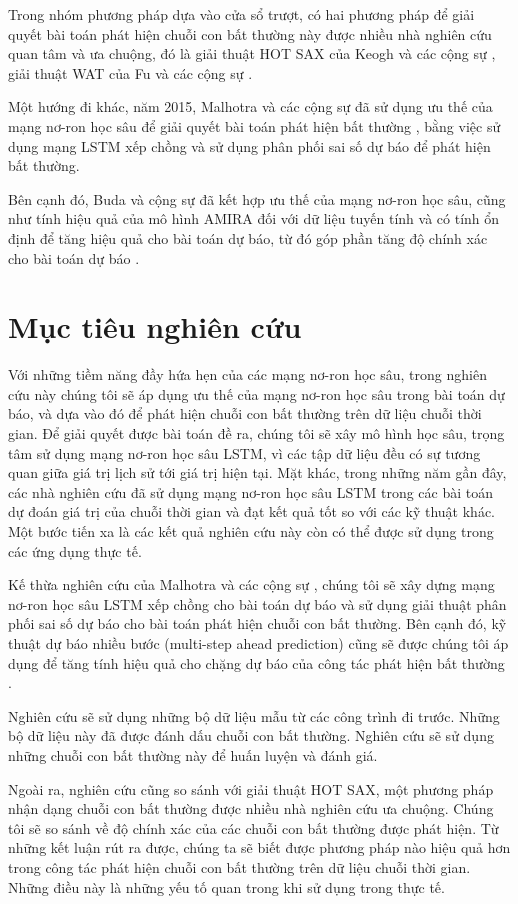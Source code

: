 Trong nhóm phương pháp dựa vào cửa sổ trượt, có hai phương pháp để giải quyết bài toán phát hiện chuỗi con bất thường này được nhiều nhà nghiên cứu quan tâm và ưa chuộng, đó là giải thuật HOT SAX của Keogh và các cộng sự \cite{st12}, giải thuật WAT của Fu và các cộng sự \cite{st13}.

Một hướng đi khác, năm 2015, Malhotra và các cộng sự đã sử dụng ưu thế của mạng nơ-ron học sâu để giải quyết bài toán phát hiện bất thường \cite{st14}, bằng việc sử dụng mạng LSTM xếp chồng và sử dụng phân phối sai số dự báo để phát hiện bất thường. 

Bên cạnh đó, Buda và cộng sự đã kết hợp ưu thế của mạng nơ-ron học sâu, cũng như tính hiệu quả của mô hình AMIRA đối với dữ liệu tuyến tính và có tính ổn định để tăng hiệu quả cho bài toán dự báo, từ đó góp phần tăng độ chính xác cho bài toán dự báo \cite{st15}. 

\section{Mục tiêu nghiên cứu}
Với những tiềm năng đầy hứa hẹn của các mạng nơ-ron học sâu, trong nghiên cứu này chúng tôi sẽ áp dụng ưu thế của mạng nơ-ron học sâu trong bài toán dự báo, và dựa vào đó để phát hiện chuỗi con bất thường trên dữ liệu chuỗi thời gian. Để giải quyết được bài toán đề ra, chúng tôi sẽ xây mô hình học sâu, trọng tâm sử dụng mạng nơ-ron học sâu LSTM, vì các tập dữ liệu đều có sự tương quan giữa giá trị lịch sử tới giá trị hiện tại. Mặt khác, trong những năm gần đây, các nhà nghiên cứu đã sử dụng mạng nơ-ron học sâu LSTM trong các bài toán dự đoán giá trị của chuỗi thời gian và đạt kết quả tốt so với các kỹ thuật khác. Một bước tiến xa là các kết quả nghiên cứu này còn có thể được sử dụng trong các ứng dụng thực tế.

Kế thừa nghiên cứu của Malhotra và các cộng sự \cite{st14}, chúng tôi sẽ xây dựng mạng nơ-ron học sâu LSTM xếp chồng cho bài toán dự báo và sử dụng giải thuật phân phối sai số dự báo \cite{st16} cho bài toán phát hiện chuỗi con bất thường. Bên cạnh đó, kỹ thuật dự báo nhiều bước (multi-step ahead prediction) cũng sẽ được chúng tôi áp dụng để tăng tính hiệu quả cho chặng dự báo của công tác phát hiện bất thường \cite{st17}.

Nghiên cứu sẽ sử dụng những bộ dữ liệu mẫu từ các công trình đi trước. Những bộ dữ liệu này đã được đánh dấu chuỗi con bất thường. Nghiên cứu sẽ sử dụng những chuỗi con bất thường này để huấn luyện và đánh giá.

Ngoài ra, nghiên cứu cũng so sánh với giải thuật HOT SAX, một phương pháp nhận dạng chuỗi con bất thường được nhiều nhà nghiên cứu ưa chuộng. Chúng tôi sẽ so sánh về độ chính xác của các chuỗi con bất thường được phát hiện. Từ những kết luận rút ra được, chúng ta sẽ biết được phương pháp nào hiệu quả hơn trong công tác phát hiện chuỗi con bất thường trên dữ liệu chuỗi thời gian. Những điều này là những yếu tố quan trong khi sử dụng trong thực tế.

